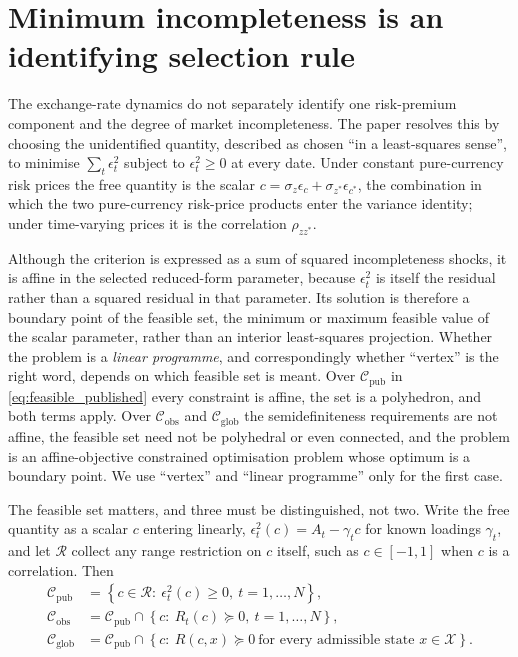 \documentclass[11pt]{article}
\theoremstyle{definition}
\begin{document}
\FloatBarrier
\section{Minimum incompleteness is an identifying selection rule}\label{app:mincomp}

The exchange-rate dynamics do not separately identify one risk-premium component and the degree of market incompleteness. The paper resolves this by choosing the unidentified quantity, described as chosen ``in a least-squares sense'', to minimise $\sum_t\epsilon_t^2$ subject to $\epsilon_t^2\ge0$ at every date. Under constant pure-currency risk prices the free quantity is the scalar $c=\sigma_z\epsilon_c+\sigma_{z^*}\epsilon_{c^*}$, the combination in which the two pure-currency risk-price products enter the variance identity; under time-varying prices it is the correlation $\rho_{zz^*}$.

Although the criterion is expressed as a sum of squared incompleteness shocks, it is affine in the selected reduced-form parameter, because $\epsilon_t^2$ is itself the residual rather than a squared residual in that parameter. Its solution is therefore a boundary point of the feasible set, the minimum or maximum feasible value of the scalar parameter, rather than an interior least-squares projection. Whether the problem is a \emph{linear programme}, and correspondingly whether ``vertex'' is the right word, depends on which feasible set is meant. Over $\mathcal C_{\text{pub}}$ in \eqref{eq:feasible_published} every constraint is affine, the set is a polyhedron, and both terms apply. Over $\mathcal C_{\text{obs}}$ and $\mathcal C_{\text{glob}}$ the semidefiniteness requirements are not affine, the feasible set need not be polyhedral or even connected, and the problem is an affine-objective constrained optimisation problem whose optimum is a boundary point. We use ``vertex'' and ``linear programme'' only for the first case.

The feasible set matters, and three must be distinguished, not two. Write the free quantity as a scalar $c$ entering linearly, $\epsilon_t^2(c)=A_t-\gamma_tc$ for known loadings $\gamma_t$, and let $\mathcal R$ collect any range restriction on $c$ itself, such as $c\in[-1,1]$ when $c$ is a correlation. Then
\begin{align}
\mathcal C_{\text{pub}}&=\left\{c\in\mathcal R:\ \epsilon_t^2(c)\ge0,\ t=1,\dots,N\right\},
\label{eq:feasible_published}\\
\mathcal C_{\text{obs}}&=\mathcal C_{\text{pub}}\cap\left\{c:\ R_t(c)\succeq0,\ t=1,\dots,N\right\},
\label{eq:feasible_observed}\\
\mathcal C_{\text{glob}}&=\mathcal C_{\text{pub}}\cap\left\{c:\ R(c,x)\succeq0\ \text{for every admissible state }x\in\mathcal X\right\}.
\label{eq:feasible_global}
\end{align}
\end{document}
